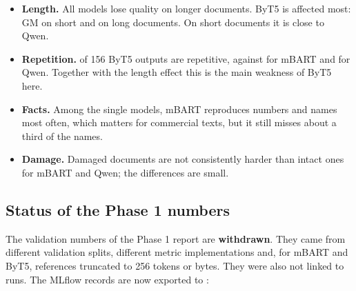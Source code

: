 \documentclass[a4paper,12pt]{article}
\begin{document}
\begin{itemize}
    \item \textbf{Length.} All models lose quality on longer documents. ByT5 is affected most: GM \BtShort{} on short and \BtLong{} on long documents. On short documents it is close to Qwen.
    \item \textbf{Repetition.} \BtRep{} of 156 ByT5 outputs are repetitive, against \MbRep{} for mBART and \QwRep{} for Qwen. Together with the length effect this is the main weakness of ByT5 here.
    \item \textbf{Facts.} Among the single models, mBART reproduces numbers and names most often, which matters for commercial texts, but it still misses about a third of the names.
    \item \textbf{Damage.} Damaged documents are not consistently harder than intact ones for mBART and Qwen; the differences are small.
\end{itemize}

\subsection{Status of the Phase 1 numbers}
\label{sec:phaseone}
The validation numbers of the Phase 1 report are \textbf{withdrawn}. They came from different validation splits, different metric implementations and, for mBART and ByT5, references truncated to 256 tokens or bytes. They were also not linked to runs. The MLflow records are now exported to :
\end{document}
